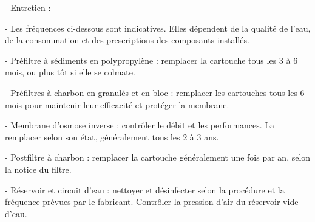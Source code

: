 \documentclass[10pt,a4paper]{article}
\begin{document}
- Entretien :

  - Les fréquences ci-dessous sont indicatives. Elles dépendent de la qualité de l’eau, de la consommation et des prescriptions des composants installés.

  - Préfiltre à sédiments en polypropylène : remplacer la cartouche tous les 3 à 6 mois, ou plus tôt si elle se colmate.

  - Préfiltres à charbon en granulés et en bloc : remplacer les cartouches tous les 6 mois pour maintenir leur efficacité et protéger la membrane.

  - Membrane d’osmose inverse : contrôler le débit et les performances. La remplacer selon son état, généralement tous les 2 à 3 ans.

  - Postfiltre à charbon : remplacer la cartouche généralement une fois par an, selon la notice du filtre.

  - Réservoir et circuit d’eau : nettoyer et désinfecter selon la procédure et la fréquence prévues par le fabricant. Contrôler la pression d’air du réservoir vide d’eau.
\end{document}
